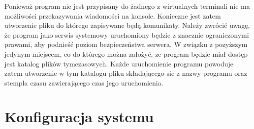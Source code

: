 Ponieważ program nie jest przypisany do żadnego z wirtualnych
terminali nie ma możliwości przekazywania wiadomości na
konsole. Konieczne jest zatem utworzenie pliku do którego zapisywane
będą komunikaty. Należy zwrócić uwagę, że program jako serwis
systemowy uruchomiony będzie z znacznie ograniczonymi prawami, aby
podnieść poziom bezpieczeństwa serwera. W związku z pozyższym jedynym
miejscem, co do którego można założyć, ze program będzie miał dostęp
jest katalog plików tymczasowych. Każde uruchomienie programu powoduje
zatem utworzenie w tym katalogu pliku składającego sie z nazwy
programu oraz stempla czasu zawierającego czas jego uruchomienia.

\section[Konfiguracja systemu][Konfiguracja systemu]{Konfiguracja systemu}
